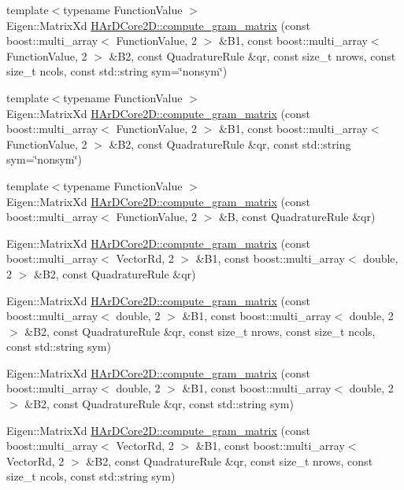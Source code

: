 \begin{DoxyCompactItemize}
{\footnotesize template$<$typename Function\+Value $>$ }\\Eigen\+::\+Matrix\+Xd \hyperlink{group__Basis_ga29885facf8b5a576e7e0b609d1e3124f}{H\+Ar\+D\+Core2\+D\+::compute\+\_\+gram\+\_\+matrix} (const boost\+::multi\+\_\+array$<$ Function\+Value, 2 $>$ \&B1, const boost\+::multi\+\_\+array$<$ Function\+Value, 2 $>$ \&B2, const Quadrature\+Rule \&qr, const size\+\_\+t nrows, const size\+\_\+t ncols, const std\+::string sym=\char`\"{}nonsym\char`\"{})
\item 
{\footnotesize template$<$typename Function\+Value $>$ }\\Eigen\+::\+Matrix\+Xd \hyperlink{group__Basis_gafea1bf5033abb255fd6b73a3a30bf09e}{H\+Ar\+D\+Core2\+D\+::compute\+\_\+gram\+\_\+matrix} (const boost\+::multi\+\_\+array$<$ Function\+Value, 2 $>$ \&B1, const boost\+::multi\+\_\+array$<$ Function\+Value, 2 $>$ \&B2, const Quadrature\+Rule \&qr, const std\+::string sym=\char`\"{}nonsym\char`\"{})
\item 
{\footnotesize template$<$typename Function\+Value $>$ }\\Eigen\+::\+Matrix\+Xd \hyperlink{group__Basis_ga0c65c290a977d9d35ae51d6edde392a8}{H\+Ar\+D\+Core2\+D\+::compute\+\_\+gram\+\_\+matrix} (const boost\+::multi\+\_\+array$<$ Function\+Value, 2 $>$ \&B, const Quadrature\+Rule \&qr)
\item 
Eigen\+::\+Matrix\+Xd \hyperlink{group__Basis_ga56ea5a2eec9e5f2534c5ea34c6f8e973}{H\+Ar\+D\+Core2\+D\+::compute\+\_\+gram\+\_\+matrix} (const boost\+::multi\+\_\+array$<$ Vector\+Rd, 2 $>$ \&B1, const boost\+::multi\+\_\+array$<$ double, 2 $>$ \&B2, const Quadrature\+Rule \&qr)
\item 
Eigen\+::\+Matrix\+Xd \hyperlink{group__Basis_ga4172a9ecfd889368855cf0715211e394}{H\+Ar\+D\+Core2\+D\+::compute\+\_\+gram\+\_\+matrix} (const boost\+::multi\+\_\+array$<$ double, 2 $>$ \&B1, const boost\+::multi\+\_\+array$<$ double, 2 $>$ \&B2, const Quadrature\+Rule \&qr, const size\+\_\+t nrows, const size\+\_\+t ncols, const std\+::string sym)
\item 
Eigen\+::\+Matrix\+Xd \hyperlink{group__Basis_ga7eda4d0d1366297ea84390f07c0a64ee}{H\+Ar\+D\+Core2\+D\+::compute\+\_\+gram\+\_\+matrix} (const boost\+::multi\+\_\+array$<$ double, 2 $>$ \&B1, const boost\+::multi\+\_\+array$<$ double, 2 $>$ \&B2, const Quadrature\+Rule \&qr, const std\+::string sym)
\item 
Eigen\+::\+Matrix\+Xd \hyperlink{group__Basis_ga1183170eea0f44386e8a16ab1cdaf81a}{H\+Ar\+D\+Core2\+D\+::compute\+\_\+gram\+\_\+matrix} (const boost\+::multi\+\_\+array$<$ Vector\+Rd, 2 $>$ \&B1, const boost\+::multi\+\_\+array$<$ Vector\+Rd, 2 $>$ \&B2, const Quadrature\+Rule \&qr, const size\+\_\+t nrows, const size\+\_\+t ncols, const std\+::string sym)

\end{DoxyCompactItemize}
